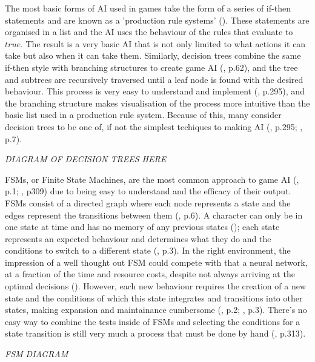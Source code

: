 \documentclass[11pt, a4paper]{article}
\begin{document}
The most basic forms of AI used in games take the form of a series of if-then statements and are known as a 'production rule systems' (\cite{tozour2002evolution}). These statements are organised in a list and the AI uses the behaviour of the rules that evaluate to $true$. The result is a very basic AI that is not only limited to what actions it can take but also when it can take them. Similarly, decision trees combine the same if-then style with branching structures to create game AI (\cite{nareyek2004ai}, p.62), and the tree and subtrees are recursively traversed until a leaf node is found with the desired behaviour. This process is very easy to understand and implement (\cite{millington2019ai}, p.295), and the branching structure makes visualisation of the process more intuitive than the basic list used in a production rule system. Because of this, many consider decision trees to be one of, if not the simplest techiques to making AI (\cite{millington2019ai}, p.295; \cite{tozour2002evolution}, p.7).

\emph{DIAGRAM OF DECISION TREES HERE}

FSMs, or Finite State Machines, are the most common approach to game AI (\cite{orkin2006three}, p.1; \cite{millington2019ai}, p309) due to being easy to understand and the efficacy of their output. FSMs consist of a directed graph where each node represents a state and the edges represent the transitions between them (\cite{tozour2002evolution}, p.6). A character can only be in one state at time and has no memory of any previous states (\cite{colledanchise2014performance}); each state represents an expected behaviour and determines what they do and the conditions to switch to a different state (\cite{diller2004behavior}, p.3). In the right environment, the impression of a well thought out FSM could compete with that a neural network, at a fraction of the time and resource costs, despite not always arriving at the optimal decisions (\cite{sweetser2002current}). However, each new behaviour requires the creation of a new state and the conditions of which this state integrates and transitions into other states, making expansion and maintainance cumbersome (\cite{sweetser2002current}, p.2; \cite{lim2010evolving}, p.3). There's no easy way to combine the tests inside of FSMs and selecting the conditions for a state transition is still very much a process that must be done by hand (\cite{millington2019ai}, p.313). 

\emph{FSM DIAGRAM}
\end{document}
